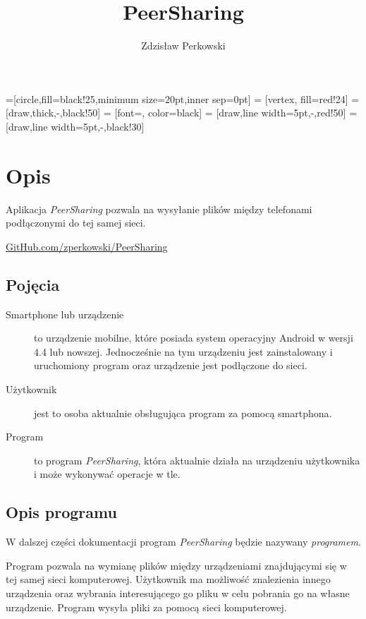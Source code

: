 \documentclass[12pt,a4paper]{article}
\author{Zdzisław Perkowski}
\title{PeerSharing}
\begin{document}
=[circle,fill=black!25,minimum size=20pt,inner sep=0pt]
 = [vertex, fill=red!24]
 = [draw,thick,-,black!50]
 = [font=\tiny, color=black]
 = [draw,line width=5pt,-,red!50]
 = [draw,line width=5pt,-,black!30]

\maketitle
\tableofcontents
\pagebreak


\section{Opis}
Aplikacja \textit{PeerSharing} pozwala na wysyłanie plików między telefonami podłączonymi do tej samej sieci.

\begin{center}
\href{https://github.com/zperkowski/PeerSharing}{GitHub.com/zperkowski/PeerSharing}
\end{center}

\subsection{Pojęcia}
\begin{description}
	\item[Smartphone lub urządzenie] to urządzenie mobilne, które posiada system operacyjny Android w wersji 4.4 lub nowszej. Jednocześnie na tym urządzeniu jest zainstalowany i uruchomiony program oraz urządzenie jest podłączone do sieci.
	\item[Użytkownik] jest to osoba aktualnie obsługująca program za pomocą smartphona.
	\item[Program] to program \textit{PeerSharing}, która aktualnie działa na urządzeniu użytkownika i może wykonywać operacje w tle.
\end{description}

\subsection{Opis programu}

W dalszej części dokumentacji program \textit{PeerSharing} będzie nazywany \textit{programem}.

Program pozwala na wymianę plików między urządzeniami znajdującymi się w tej samej sieci komputerowej. Użytkownik ma możliwość znalezienia innego urządzenia oraz wybrania interesującego go pliku w celu pobrania go na własne urządzenie. Program wysyła pliki za pomocą sieci komputerowej.
\end{document}
